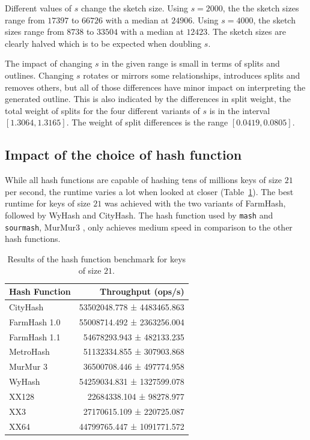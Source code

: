 Different values of $s$ change the sketch size. Using $s=2000$, the the sketch
sizes range from $17397$ to $66726$ with a median at $24906$. Using $s=4000$,
the sketch sizes range from $8738$ to $33504$ with a median at $12423$. The
sketch sizes are clearly halved which is to be expected when doubling $s$.

The impact of changing $s$ in the given range is small in terms of splits and
outlines. Changing $s$ rotates or mirrors some relationships, introduces splits
and removes others, but all of those differences have minor impact on
interpreting the generated outline. This is also indicated by the differences in
split weight, the total weight of splits for the four different variants of $s$
is in the interval $[1.3064, 1.3165]$. The weight of split differences is the
range $[0.0419, 0.0805]$.

\subsection*{Impact of the choice of hash function}
While all hash functions are capable of hashing tens of millions keys of size
$21$ per second, the runtime varies a lot when looked at closer
(Table~\ref{ta:hashbenchmark}). The best runtime for keys of size $21$ was
achieved with the two variants of FarmHash, followed by WyHash and CityHash. The
hash function used by \texttt{mash} and \texttt{sourmash}, MurMur3
\cite{ondovMashFastGenome2016,irberLightweightCompositionalAnalysis2022}, only
achieves medium speed in comparison to the other hash functions.  

\begin{table}[]
  \centering
  \begin{tabular}{@{}lr@{}}
  \toprule
  \textbf{Hash Function }& \textbf{Throughput (ops/s)}                      \\
  \midrule
  CityHash      & 53502048.778 ± 4483465.863   \\
  FarmHash 1.0  & 55008714.492 ± 2363256.004   \\
  FarmHash 1.1  & 54678293.943 ±  482133.235   \\
  MetroHash     & 51132334.855 ±  307903.868   \\
  MurMur 3      & 36500708.446 ±  497774.958   \\
  WyHash        & 54259034.831 ± 1327599.078   \\
  XX128         & 22684338.104 ±   98278.977   \\
  XX3           & 27170615.109 ±  220725.087   \\
  XX64          & 44799765.447 ± 1091771.572  \\
  \bottomrule
  \end{tabular}
  \caption{Results of the hash function benchmark for keys of size $21$.}
  \label{ta:hashbenchmark}
  \end{table}


